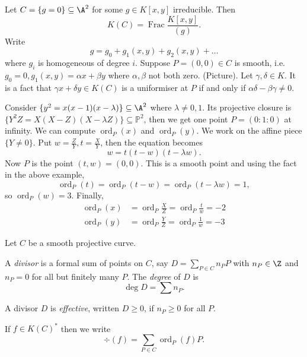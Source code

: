 \documentclass[a4paper]{article}
\theoremstyle{definition}
\theoremstyle{theorem}
\renewcommand*{\P}{\mathbb{P}}
\DeclareMathOperator{\ord}{ord}
\begin{document}
\begin{eg}
  Let \(C = \{g = 0\} \subseteq \A^2\) for some \(g \in K[x, y]\) irreducible. Then
  \[
    K(C) = \operatorname{Frac} \frac{K[x, y]}{(g)}.
  \]
  Write
  \[
    g = g_0 + g_1(x, y) + g_2(x, y) + \dots
  \]
  where \(g_i\) is homogeneous of degree \(i\). Suppose \(P = (0, 0) \in C\) is smooth, i.e.\ \(g_0 = 0, g_1(x, y) = \alpha x + \beta y\) where \(\alpha, \beta\) not both zero. (Picture). Let \(\gamma, \delta \in K\). It is a fact that \(\gamma x + \delta y \in K(C)\) is a uniformiser at \(P\) if and only if \(\alpha \delta - \beta \gamma \neq 0\).
\end{eg}

\begin{eg}
  Consider \(\{y^2 = x(x - 1)(x - \lambda)\} \subseteq \A^2\) where \(\lambda \neq 0, 1\). Its projective closure is \(\{Y^2Z = X(X - Z)(X - \lambda Z)\} \subseteq \P^2\), then we get one point \(P = (0: 1: 0)\) at infinity. We can compute \(\ord_P(x)\) and \(\ord_P(y)\). We work on the affine piece \(\{Y \neq 0\}\). Put \(w = \frac{Z}{Y}, t = \frac{X}{Y}\), then the equation becomes
  \[
    w = t(t - w)(t - \lambda w).
  \]
  Now \(P\) is the point \((t, w) = (0, 0)\). This is a smooth point and using the fact in the above example,
  \[
    \ord_P(t) = \ord_P(t - w) = \ord_P(t - \lambda w) = 1,
  \]
  so \(\ord_P(w) = 3\). Finally,
  \begin{align*}
    \ord_P(x) &= \ord_P \frac{X}{Z} = \ord_P \frac{t}{w} = -2 \\
    \ord_P(y) &= \ord_P \frac{Y}{Z} = \ord_P \frac{1}{w} = -3
  \end{align*}
\end{eg}

Let \(C\) be a smooth projective curve.

\begin{definition}[divisor]
  A \emph{divisor} is a formal sum of points on \(C\), say \(D = \sum_{P \in C} n_P P\) with \(n_P \in \Z\) and \(n_P = 0\) for all but finitely many \(P\). The \emph{degree} of \(D\) is
  \[
    \deg D = \sum n_P.
  \]
\end{definition}

\begin{definition}
  A divisor \(D\) is \emph{effective}, written \(D \geq 0\), if \(n_P \geq 0\) for all \(P\).
\end{definition}

If \(f \in K(C)^*\) then we write
\[
  \div(f) = \sum_{P \in C} \ord_P(f) P.
\]
\end{document}
